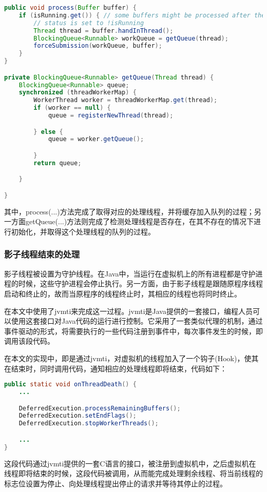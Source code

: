 \begin{lstlisting}[language=Java]
public void process(Buffer buffer) {
	if (isRunning.get()) { // some buffers might be processed after the
		// status is set to !isRunning
		Thread thread = buffer.handInThread();
		BlockingQueue<Runnable> workQueue = getQueue(thread);
		forceSubmission(workQueue, buffer);
	}
}

private BlockingQueue<Runnable> getQueue(Thread thread) {
	BlockingQueue<Runnable> queue;
	synchronized (threadWorkerMap) {
		WorkerThread worker = threadWorkerMap.get(thread);
		if (worker == null) {
			queue = registerNewThread(thread);

		} else {
			queue = worker.getQueue();

		}
		return queue;

	}

}
\end{lstlisting}

其中，process(...)方法完成了取得对应的处理线程，并将缓存加入队列的过程；另一方面getQueue(...)方法则完成了检测处理线程是否存在，在其不存在的情况下进行初始化，并取得这个处理线程的队列的过程。

\subsubsection{影子线程结束的处理}

影子线程被设置为守护线程。在Java中，当运行在虚拟机上的所有进程都是守护进程的时候，这些守护进程会停止执行。另一方面，由于影子线程是跟随原程序线程启动和终止的，故而当原程序的线程终止时，其相应的线程也将同时终止。

在本文中使用了jvmti来完成这一过程。jvmti是Java提供的一套接口，编程人员可以使用这套接口对Java代码的运行进行控制。它采用了一套类似代理的机制，通过事件驱动的形式，将需要执行的一些代码注册到事件中，每次事件发生的时候，即调用该段代码。

在本文的实现中，即是通过jvmti，对虚拟机的线程加入了一个钩子(Hook)，使其在结束时，同时调用代码，通知相应的处理线程即将结束，代码如下：

\begin{lstlisting}[language=Java]
public static void onThreadDeath() {
	...

	DeferredExecution.processRemainingBuffers();
	DeferredExecution.setEndFlags();
	DeferredExecution.stopWorkerThreads();

	...
}
\end{lstlisting}

这段代码通过jvmti提供的一套C语言的接口，被注册到虚拟机中，之后虚拟机在线程即将结束的时候，这段代码被调用，从而能完成处理剩余线程、将当前线程的标志位设置为停止、向处理线程提出停止的请求并等待其停止的过程。

